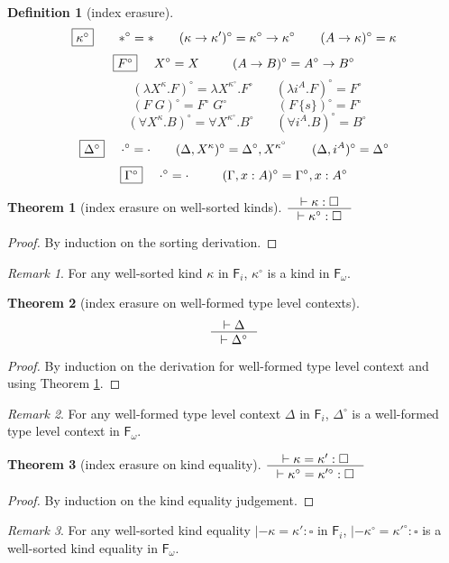 \documentclass[preprint]{sigplanconf}
\newcommand{\Fi}{\ensuremath{\mathsf{F}_i}}
\newcommand{\Fw}{\ensuremath{\mathsf{F}_\omega}}
\theoremstyle{plain}
\newtheorem{theorem}{Theorem}
\theoremstyle{remark}
\newtheorem{remark}{Remark}
\theoremstyle{definition}
\newtheorem{definition}{Definition}
\begin{document}
\paragraph{}
\begin{definition}[index erasure]\label{def:ierase}
\[ \fbox{$\kappa^\circ$}
 ~~~~ ~~
 *^\circ =
 *
 ~~~~ ~~
 (\kappa -> \kappa')^\circ =
 \kappa^\circ -> \kappa^\circ
 ~~~~ ~~
 (A -> \kappa)^\circ =
 \kappa
\]
\[ \fbox{$F^\circ$}
 ~~~~
 X^\circ =
 X
 ~~~~ ~~~~
 (A -> B)^\circ =
 A^\circ -> B^\circ
\]
\[ \qquad
 (\lambda X^\kappa.F)^\circ =
 \lambda X^{\kappa^\circ}.F^\circ
 ~~~~ ~~~~
 (\lambda i^A.F)^\circ =
 F^\circ
\]
\[ \qquad
 (F\;G)^\circ =
 F^\circ\;G^\circ
 ~~~~ ~~~~ ~~~~ ~~~~ ~~
 (F\,\{s\})^\circ =
 F^\circ
\]
\[ \qquad
 (\forall X^\kappa . B)^\circ =
 \forall X^{\kappa^\circ} . B^\circ
 ~~~~ ~~~~
 (\forall i^A . B)^\circ =
 B^\circ
\]
\[ \fbox{$\Delta^\circ$}
 ~~~~
 \cdot^\circ = \cdot
 ~~~~ ~~
 (\Delta,X^\kappa)^\circ = \Delta^\circ,X^{\kappa^\circ}
 ~~~~ ~~
 (\Delta,i^A)^\circ = \Delta^\circ
\]
\[ \fbox{$\Gamma^\circ$}
 ~~~~
 \cdot^\circ = \cdot
 ~~~~ ~~~~
 (\Gamma,x:A)^\circ = \Gamma^\circ,x:A^\circ
\]
\end{definition}

\begin{theorem}[index erasure on well-sorted kinds]
\label{thm:ierasesorting}
	$\inference{|- \kappa : \square}{|- \kappa^\circ : \square}$
\end{theorem}
\begin{proof}
	By induction on the sorting derivation.
\end{proof}
\begin{remark}
For any well-sorted kind $\kappa$ in \Fi,
$\kappa^\circ$ is a kind in \Fw.
\end{remark}

\begin{theorem}[index erasure on well-formed type level contexts]
\label{thm:ierasetyctx}
\[ \inference{|- \Delta}{|- \Delta^\circ} \]
\end{theorem}
\begin{proof}
	By induction on the derivation for well-formed type level context
	and using Theorem \ref{thm:ierasesorting}.
\end{proof}
\begin{remark}
For any well-formed type level context $\Delta$ in \Fi,
$\Delta^\circ$ is a well-formed type level context in \Fw.
\end{remark}

\begin{theorem}[index erasure on kind equality]\label{thm:ierasekindeq}
$ \inference{|- \kappa=\kappa':\square}
	{|- \kappa^\circ=\kappa'^\circ:\square}
$
\end{theorem}
\begin{proof}
	By induction on the kind equality judgement.
\end{proof}
\begin{remark}
For any well-sorted kind equality $|- \kappa=\kappa':\square$ in \Fi,
$|- \kappa^\circ=\kappa'^\circ:\square$ is a well-sorted kind equality in \Fw.
\end{remark}
\end{document}
